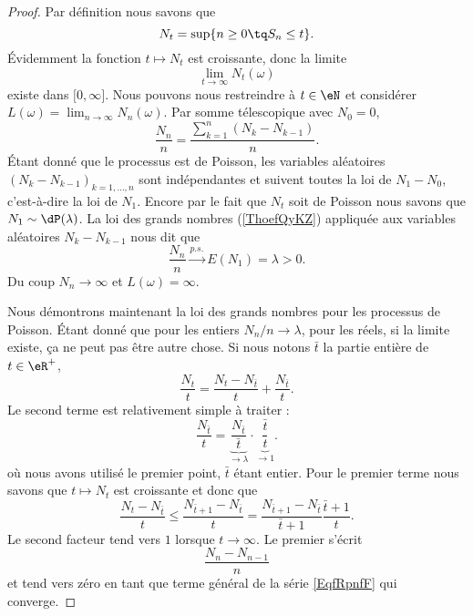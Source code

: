\begin{proof}
	Par définition nous savons que
	\begin{equation}
		N_t=\sup\{ n\geq 0\tq S_n\leq t \}.
	\end{equation}
	Évidemment la fonction \( t\mapsto N_t\) est croissante, donc la limite
	\begin{equation}
		\lim_{t\to \infty} N_t(\omega)
	\end{equation}
	existe dans \( \mathopen[ 0 , \infty \mathclose]\). Nous pouvons nous restreindre à \( t\in \eN\) et considérer \( L(\omega)=\lim_{n\to \infty} N_n(\omega)\). Par somme télescopique avec \( N_0=0\),
	\begin{equation}    \label{EqfRpnfF}
		\frac{ N_n }{ n }=\frac{ \sum_{k=1}^n(N_k-N_{k-1}) }{ n }.
	\end{equation}
	Étant donné que le processus est de Poisson, les variables aléatoires \( (N_k-N_{k-1})_{k=1,\ldots, n}\) sont indépendantes et suivent toutes la loi de \( N_1-N_0\), c'est-à-dire la loi de \( N_1\). Encore par le fait que \( N_t\) soit de Poisson nous savons que \( N_1\sim\dP(\lambda)\). La loi des grands nombres (\ref{ThoefQyKZ}) appliquée aux variables aléatoires \( N_k-N_{k-1}\) nous dit que
	\begin{equation}
		\frac{ N_n }{ n }\stackrel{p.s.}{\longrightarrow}E(N_1)=\lambda>0.
	\end{equation}
	Du coup \( N_n\to \infty\) et \( L(\omega)=\infty\).

	Nous démontrons maintenant la loi des grands nombres pour les processus de Poisson. Étant donné que pour les entiers \( N_n/n\to \lambda\), pour les réels, si la limite existe, ça ne peut pas être autre chose. Si nous notons \( \bar t\) la partie entière de \( t\in \eR^+\),
	\begin{equation}
		\frac{ N_t }{ t }=\frac{ N_t-N_{\bar t} }{ t }+\frac{ N_{\bar t} }{ t }.
	\end{equation}
	Le second terme est relativement simple à traiter :
	\begin{equation}
		\frac{ N_{\bar t} }{ t }=\underbrace{\frac{ N_{\bar t} }{ \bar t }}_{\to \lambda}\cdot\underbrace{\frac{ \bar t }{ t }}_{\to 1}.
	\end{equation}
	où nous avons utilisé le premier point, \( \bar t\) étant entier. Pour le premier terme nous savons que \( t\mapsto N_t\) est croissante et donc que
	\begin{equation}
		\frac{ N_t-N_{\bar t} }{ t }\leq \frac{ N_{\bar t+1}-N_{\bar t}}{ t }=\frac{ N_{\bar t+1}-N_{\bar t} }{ \bar t+1 }\frac{ \bar t+1 }{ t }.
	\end{equation}
	Le second facteur tend vers \( 1\) lorsque \( t\to \infty\). Le premier s'écrit
	\begin{equation}    \label{eqtPgPpJ}
		\frac{ N_n-N_{n-1} }{ n }
	\end{equation}
	et tend vers zéro en tant que terme général de la série \eqref{EqfRpnfF} qui converge.
\end{proof}

